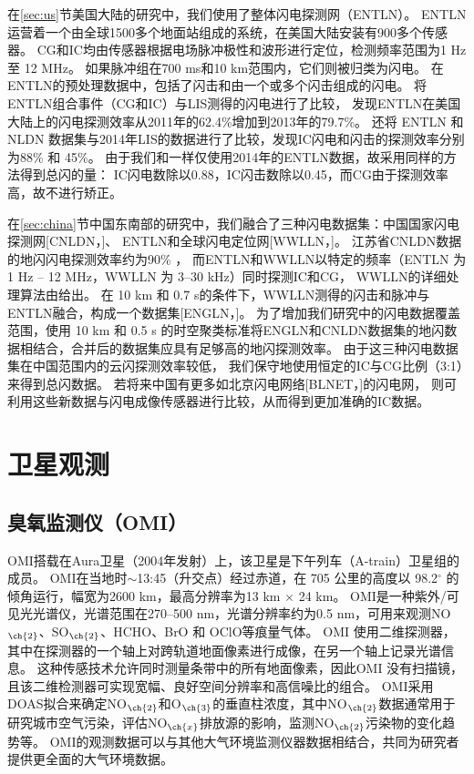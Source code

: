 在\ref{sec:us}节美国大陆的研究中，我们使用了整体闪电探测网（ENTLN）。
ENTLN运营着一个由全球1500多个地面站组成的系统，在美国大陆安装有900多个传感器\citep{Zhu.2017,Marchand.2019}。
CG和IC均由传感器根据电场脉冲极性和波形进行定位，检测频率范围为1 Hz 至 12 MHz。
如果脉冲组在700 ms和10 km范围内，它们则被归类为闪电。
在ENTLN的预处理数据中，包括了闪击和由一个或多个闪击组成的闪电。
\citet{Rudlosky.2015}将ENTLN组合事件（CG和IC）与LIS测得的闪电进行了比较，
发现ENTLN在美国大陆上的闪电探测效率从2011年的62.4\%增加到2013年的79.7\%。
\citet{Lapierre.2020}还将 ENTLN 和 NLDN 数据集与2014年LIS的数据进行了比较，发现IC闪电和闪击的探测效率分别为88\% 和 45\%。
由于我们和\citet{Lapierre.2020}一样仅使用2014年的ENTLN数据，故采用同样的方法得到总闪的量：
IC闪电数除以0.88，IC闪击数除以0.45，而CG由于探测效率高，故不进行矫正。

在\ref{sec:china}节中国东南部的研究中，我们融合了三种闪电数据集：中国国家闪电探测网[CNLDN，\citet{Yang.2015}]、
ENTLN和全球闪电定位网[WWLLN，\citet{Rodger.2006}]。
江苏省CNLDN数据的地闪闪电探测效率约为90\% \citep{Li.2017a}，
而ENTLN和WWLLN以特定的频率（ENTLN 为 1 Hz -- 12 MHz，WWLLN 为 3--30 kHz）同时探测IC和CG，
WWLLN的详细处理算法由\citet{Rodger.2004}给出。
在 10 km 和 0.7 s的条件下，WWLLN测得的闪击和脉冲与ENTLN融合，构成一个数据集[ENGLN，\citet{Virts.2020b}]。
为了增加我们研究中的闪电数据覆盖范围，使用 10 km 和 0.5 s 的时空聚类标准将ENGLN和CNLDN数据集的地闪数据相结合\citep{Zhao.2020}，合并后的数据集应具有足够高的地闪探测效率。
由于这三种闪电数据集在中国范围内的云闪探测效率较低，
我们保守地使用恒定的IC与CG比例（3:1）来得到总闪数据\citep{Wu.2016,Bandholnopparat.2020}。
若将来中国有更多如北京闪电网络[BLNET，\citet{Srivastava.2017}]的闪电网，
则可利用这些新数据与闪电成像传感器进行比较\citep{Rudlosky.2013,Poelman.2020}，从而得到更加准确的IC数据。

\section{卫星观测}

\subsection{臭氧监测仪（OMI）}

OMI搭载在Aura卫星（2004年发射）上，该卫星是下午列车（A-train）卫星组的成员\citep{Levelt.2006,Levelt.2018}。
OMI在当地时$\sim$13:45（升交点）经过赤道，在 705 公里的高度以 98.2$^{\circ}$ 的倾角运行，幅宽为2600 km，最高分辨率为13 km $\times$ 24 km。
OMI是一种紫外/可见光光谱仪，光谱范围在270--500 nm，光谱分辨率约为0.5 nm，可用来观测NO$_{\ch{2}}$、SO$_{\ch{2}}$、HCHO、BrO 和 OClO等痕量气体。
OMI 使用二维探测器，其中在探测器的一个轴上对跨轨道地面像素进行成像，在另一个轴上记录光谱信息。 这种传感技术允许同时测量条带中的所有地面像素，因此OMI 没有扫描镜，且该二维检测器可实现宽幅、良好空间分辨率和高信噪比的组合。
OMI采用DOAS拟合来确定NO$_{\ch{2}}$和O$_{\ch{3}}$的垂直柱浓度，其中NO$_{\ch{2}}$数据通常用于研究城市空气污染，评估NO$_{\ch{x}}$排放源的影响，监测NO$_{\ch{2}}$污染物的变化趋势等。
OMI的观测数据可以与其他大气环境监测仪器数据相结合，共同为研究者提供更全面的大气环境数据。

